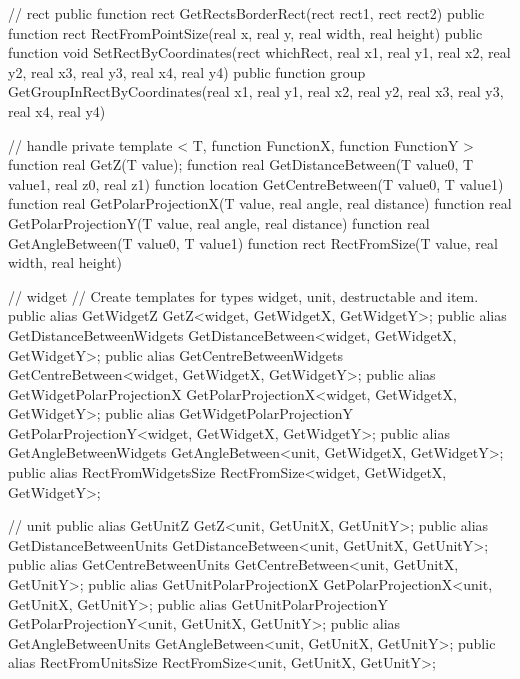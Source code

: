 {{		// rect
		public function rect GetRectsBorderRect(rect rect1, rect rect2)
		public function rect RectFromPointSize(real x, real y, real width, real height)
		public function void SetRectByCoordinates(rect whichRect, real x1, real y1, real x2, real y2, real x3, real y3, real x4, real y4)
		public function group GetGroupInRectByCoordinates(real x1, real y1, real x2, real y2, real x3, real y3, real x4, real y4)

		// handle
		private template < T, function FunctionX, function FunctionY >
		{
			function real GetZ(T value);
			function real GetDistanceBetween(T value0, T value1, real z0, real z1)
			function location GetCentreBetween(T value0, T value1)
			function real GetPolarProjectionX(T value, real angle, real distance)
			function real GetPolarProjectionY(T value, real angle, real distance)
			function real GetAngleBetween(T value0, T value1)
			function rect RectFromSize(T value, real width, real height)
		}

		// widget
		// Create templates for types widget, unit, destructable and item.
		public alias GetWidgetZ GetZ<widget, GetWidgetX, GetWidgetY>;
		public alias GetDistanceBetweenWidgets GetDistanceBetween<widget, GetWidgetX, GetWidgetY>;
		public alias GetCentreBetweenWidgets GetCentreBetween<widget, GetWidgetX, GetWidgetY>;
		public alias GetWidgetPolarProjectionX GetPolarProjectionX<widget, GetWidgetX, GetWidgetY>;
		public alias GetWidgetPolarProjectionY GetPolarProjectionY<widget, GetWidgetX, GetWidgetY>;
		public alias GetAngleBetweenWidgets GetAngleBetween<unit, GetWidgetX, GetWidgetY>;
		public alias RectFromWidgetsSize RectFromSize<widget, GetWidgetX, GetWidgetY>;

		// unit
		public alias GetUnitZ GetZ<unit, GetUnitX, GetUnitY>;
		public alias GetDistanceBetweenUnits GetDistanceBetween<unit, GetUnitX, GetUnitY>;
		public alias GetCentreBetweenUnits GetCentreBetween<unit, GetUnitX, GetUnitY>;
		public alias GetUnitPolarProjectionX GetPolarProjectionX<unit, GetUnitX, GetUnitY>;
		public alias GetUnitPolarProjectionY GetPolarProjectionY<unit, GetUnitX, GetUnitY>;
		public alias GetAngleBetweenUnits GetAngleBetween<unit, GetUnitX, GetUnitY>;
		public alias RectFromUnitsSize RectFromSize<unit, GetUnitX, GetUnitY>;

}}

